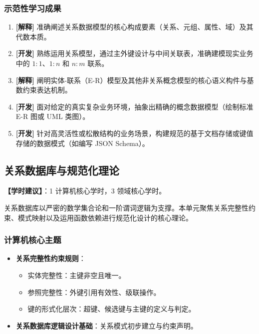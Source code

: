 \subsubsection{示范性学习成果}
\begin{enumerate}
    \item \textbf{[解释]} 准确阐述关系数据模型的核心构成要素（关系、元组、属性、域）及其代数本质。
    \item \textbf{[开发]} 熟练运用关系模型，通过主外键设计与中间关联表，准确建模现实业务中的 $1:1$、$1:n$ 和 $n:m$ 联系。
    \item \textbf{[解释]} 阐明实体-联系（E-R）模型及其他非关系概念模型的核心语义构件与基数约束表达机制。
    \item \textbf{[开发]} 面对给定的真实复杂业务环境，抽象出精确的概念数据模型（绘制标准 E-R 图或 UML 类图）。
    \item \textbf{[开发]} 针对高灵活性或松散结构的业务场景，构建规范的基于文档存储或键值存储的数据模式（如编写 JSON Schema）。
\end{enumerate}

\subsection{关系数据库与规范化理论}
\textbf{【学时建议】}：1 计算机核心学时，3 领域核心学时。

关系数据库以严密的数学集合论和一阶谓词逻辑为支撑。本单元聚焦关系完整性约束、模式映射以及运用函数依赖进行规范化设计的核心理论。

\subsubsection{计算机核心主题}
\begin{itemize}
    \item \textbf{关系完整性约束规则}：
    \begin{itemize}
        \item 实体完整性：主键非空且唯一。
        \item 参照完整性：外键引用有效性、级联操作。
        \item 键的形式化层次：超键、候选键与主键的定义与判定。
    \end{itemize}
    \item \textbf{关系数据库逻辑设计基础}：关系模式初步建立与约束声明。
\end{itemize}

